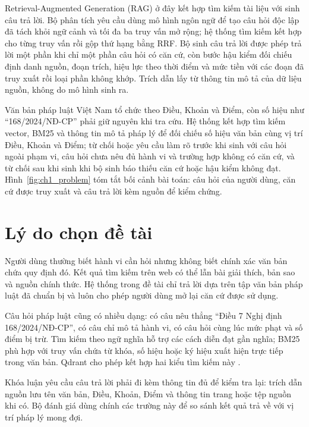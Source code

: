 \documentclass[12pt,a4paper,oneside]{report}
\begin{document}
Retrieval-Augmented Generation (RAG) ở đây kết hợp tìm kiếm tài liệu với sinh câu trả lời. Bộ phân tích yêu cầu dùng mô hình ngôn ngữ để tạo câu hỏi độc lập đã tách khỏi ngữ cảnh và tối đa ba truy vấn mở rộng; hệ thống tìm kiếm kết hợp cho từng truy vấn rồi gộp thứ hạng bằng RRF. Bộ sinh câu trả lời được phép trả lời một phần khi chỉ một phần câu hỏi có căn cứ, còn bước hậu kiểm đối chiếu định danh nguồn, đoạn trích, hiệu lực theo thời điểm và mức tiền với các đoạn đã truy xuất rồi loại phần không khớp. Trích dẫn lấy từ thông tin mô tả của dữ liệu nguồn, không do mô hình sinh ra.

Văn bản pháp luật Việt Nam tổ chức theo Điều, Khoản và Điểm, còn số hiệu như ``168/2024/NĐ-CP'' phải giữ nguyên khi tra cứu. Hệ thống kết hợp tìm kiếm vector, BM25 và thông tin mô tả pháp lý để đối chiếu số hiệu văn bản cùng vị trí Điều, Khoản và Điểm; từ chối hoặc yêu cầu làm rõ trước khi sinh với câu hỏi ngoài phạm vi, câu hỏi chưa nêu đủ hành vi và trường hợp không có căn cứ, và từ chối sau khi sinh khi bộ sinh báo thiếu căn cứ hoặc hậu kiểm không đạt.
Hình~\ref{fig:ch1_problem} tóm tắt bối cảnh bài toán: câu hỏi của người dùng, căn cứ được truy xuất và câu trả lời kèm nguồn để kiểm chứng.

\section{Lý do chọn đề tài}
Người dùng thường biết hành vi cần hỏi nhưng không biết chính xác văn bản chứa quy định đó. Kết quả tìm kiếm trên web có thể lẫn bài giải thích, bản sao và nguồn chính thức. Hệ thống trong đề tài chỉ trả lời dựa trên tập văn bản pháp luật đã chuẩn bị và luôn cho phép người dùng mở lại căn cứ được sử dụng.

Câu hỏi pháp luật cũng có nhiều dạng: có câu nêu thẳng ``Điều 7 Nghị định 168/2024/NĐ-CP'', có câu chỉ mô tả hành vi, có câu hỏi cùng lúc mức phạt và số điểm bị trừ. Tìm kiếm theo ngữ nghĩa hỗ trợ các cách diễn đạt gần nghĩa; BM25 phù hợp với truy vấn chứa từ khóa, số hiệu hoặc ký hiệu xuất hiện trực tiếp trong văn bản. Qdrant cho phép kết hợp hai kiểu tìm kiếm này \cite{qdrant_hybrid_docs}.

Khóa luận yêu cầu câu trả lời phải đi kèm thông tin đủ để kiểm tra lại: trích dẫn nguồn lưu tên văn bản, Điều, Khoản, Điểm và thông tin trang hoặc tệp nguồn khi có. Bộ đánh giá dùng chính các trường này để so sánh kết quả trả về với vị trí pháp lý mong đợi.
\end{document}
